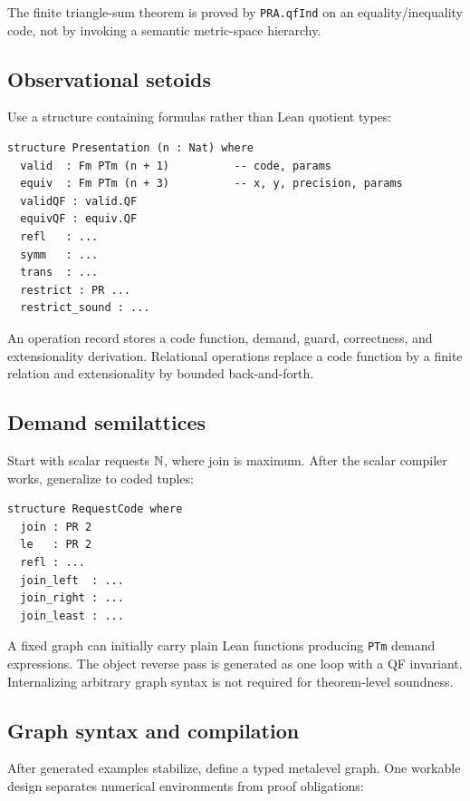 The finite triangle-sum theorem is proved by \texttt{PRA.qfInd} on an equality/inequality code, not by invoking a semantic metric-space hierarchy.

\subsection{Observational setoids}

Use a structure containing formulas rather than Lean quotient types:

\begin{lstlisting}[language={}]
structure Presentation (n : Nat) where
  valid  : Fm PTm (n + 1)          -- code, params
  equiv  : Fm PTm (n + 3)          -- x, y, precision, params
  validQF : valid.QF
  equivQF : equiv.QF
  refl   : ...
  symm   : ...
  trans  : ...
  restrict : PR ...
  restrict_sound : ...
\end{lstlisting}

An operation record stores a code function, demand, guard, correctness, and extensionality derivation.  Relational operations replace a code function by a finite relation and extensionality by bounded back-and-forth.

\subsection{Demand semilattices}

Start with scalar requests \(\mathbb{N}\), where join is maximum.  After the scalar compiler works, generalize to coded tuples:

\begin{lstlisting}[language={}]
structure RequestCode where
  join : PR 2
  le   : PR 2
  refl : ...
  join_left  : ...
  join_right : ...
  join_least : ...
\end{lstlisting}

A fixed graph can initially carry plain Lean functions producing \texttt{PTm} demand expressions.  The object reverse pass is generated as one loop with a QF invariant.  Internalizing arbitrary graph syntax is not required for theorem-level soundness.

\subsection{Graph syntax and compilation}

After generated examples stabilize, define a typed metalevel graph.  One workable design separates numerical environments from proof obligations:


